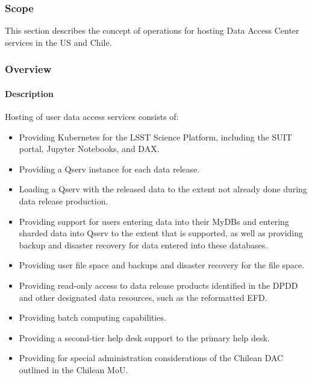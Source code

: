 \subsubsection{Scope}
This section describes the concept of operations for hosting Data Access Center services in the US and Chile.

\subsubsection{Overview}

\paragraph{Description}

Hosting of user data access services consists of:
\begin{itemize}

\item Providing Kubernetes for the LSST Science Platform, including the SUIT portal, Jupyter Notebooks, and DAX.

\item Providing a Qserv instance for each data release.

\item Loading a Qserv with the released data to the extent not already done during data release production.

\item Providing support for users entering data into their MyDBs and entering sharded data into Qserv to the extent that is supported, as well as providing backup and disaster recovery for data entered into these databases.

\item Providing user file space and backups and disaster recovery for the file space.

\item Providing read-only access to data release products identified in the DPDD and other designated data resources, such as the reformatted EFD.

\item Providing batch computing capabilities.

\item Providing a second-tier help desk support to the primary help desk.

\item Providing for special administration considerations of the Chilean DAC outlined in the Chilean MoU.


\end{itemize}
